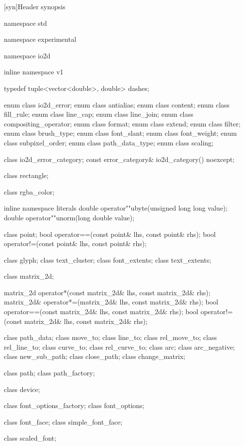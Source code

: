 [syn]{Header  synopsis}

%
\begin{codeblock}

namespace std { namespace experimental { namespace io2d { inline namespace v1 {
  typedef tuple<vector<double>, double> dashes;

  enum class io2d_error;
  enum class antialias;
  enum class content;
  enum class fill_rule;
  enum class line_cap;
  enum class line_join;
  enum class compositing_operator;
  enum class format;
  enum class extend;
  enum class filter;
  enum class brush_type;
  enum class font_slant;
  enum class font_weight;
  enum class subpixel_order;
  enum class path_data_type;
  enum class scaling;

  class io2d_error_category;
  const error_category& io2d_category() noexcept;

  class rectangle;

  class rgba_color;

  inline namespace literals {
    double operator""ubyte(unsigned long long value);
    double operator""unorm(long double value);
  }
  
  class point;
  bool operator==(const point& lhs, const point& rhs);
  bool operator!=(const point& lhs, const point& rhs);

  class glyph;
  class text_cluster;
  class font_extents;
  class text_extents;

  class matrix_2d;

  matrix_2d operator*(const matrix_2d& lhs, const matrix_2d& rhs);
  matrix_2d& operator*=(matrix_2d& lhs, const matrix_2d& rhs);
  bool operator==(const matrix_2d& lhs, const matrix_2d& rhs);
  bool operator!=(const matrix_2d& lhs, const matrix_2d& rhs);

  class path_data;
  class move_to;
  class line_to;
  class rel_move_to;
  class rel_line_to;
  class curve_to;
  class rel_curve_to;
  class arc;
  class arc_negative;
  class new_sub_path;
  class close_path;
  class change_matrix;
  
  class path;
  class path_factory;
  
  class device;

  class font_options_factory;
  class font_options;

  class font_face;
  class simple_font_face;

  class scaled_font;

}}}}
\end{codeblock}
